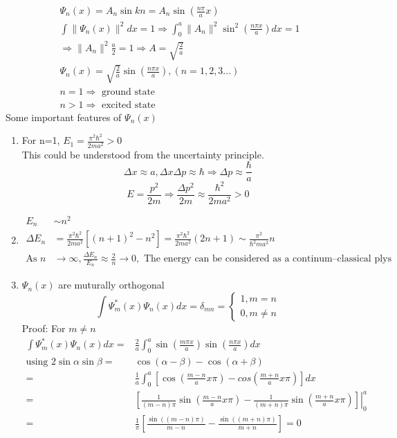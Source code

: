 \documentclass[12pt, a4paper]{article}
\begin{document}
\begin{align*}
\Psi_n(x)=A_n\sin kn=A_n\sin(\frac{n\pi}{a}x)\\
\int\|\Psi_n(x)\|^2dx=1\Rightarrow\int_0^a\|A_n\|^2\sin^2(\frac{n\pi x}{a})dx=1\\
\Rightarrow\|A_n\|^2\frac{a}{2}=1\Rightarrow A=\sqrt{\frac{2}{a}}\\
\Psi_n(x)=\sqrt{\frac{2}{a}}\sin(\frac{n\pi x}{a}), (n=1,2,3...)\\
n=1 \Rightarrow \text{ ground state}\\
n>1 \Rightarrow \text{ excited state}
\end{align*}
Some important features of $\Psi_n(x)$
\begin{enumerate}
\item For n=1, $E_1=\frac{\pi^2\hbar^2}{2ma^2}>0$\\
This could be understood from the uncertainty principle.
$$\Delta x \approx a, \Delta x \Delta p \approx\hbar\Rightarrow \Delta p \approx\frac{\hbar}{a}$$
$$E=\frac{p^2}{2m}\Rightarrow \frac{\Delta p^2}{2m}\approx \frac{\hbar^2}{2ma^2}>0$$
\item
\begin{align*}
E_n&\sim n^2\\
\Delta E_n&=\frac{\pi^2\hbar^2}{2ma^2}\left[(n+1)^2 -n^2\right]=\frac{\pi^2\hbar^2}{2ma^2}(2n+1)\sim \frac{\pi^2}{\hbar^2	ma^2}n\\
\text{As } n&\rightarrow \infty, \frac{\Delta E_n}{E_n}\approx \frac{2}{n}\rightarrow 0, \text{ The energy can be considered as a continum--classical plys}
\end{align*}
\item
$\Psi_n(x)$ are muturally orthogonal
$$\int\Psi_m^*(x)\Psi_n(x)dx=\delta_{mn}=\begin{cases}1,m=n\\0,m\not =n\end{cases}$$
Proof: For $m \not = n$
\begin{align*}
\int\Psi_m^*(x)\Psi_n(x)dx=&\frac{2}{a}\int_0^a\sin(\frac{m\pi x}{a})\sin(\frac{n\pi x}{a}) dx\\
\text{using } 2\sin\alpha\sin\beta=&\cos(\alpha - \beta)-\cos(\alpha+\beta)\\
=&\frac{1}{a}\int_0^a\left[\cos(\frac{m-n}{a}x\pi)-cos(\frac{m+n}{a}x\pi) \right]dx\\
=&\left.\left[ \frac{1}{(m-n)\pi}\sin(\frac{m-n}{a}x\pi)-\frac{1}{(m+n)\pi}\sin(\frac{m+n}{a}x\pi)\right]\right\vert_0^a\\
=&\frac{1}{\pi}\left[ \frac{\sin((m-n)\pi)}{m-n}-\frac{\sin((m+n)\pi)}{m+n}\right] = 0

\end{align*}
\end{enumerate}
\end{document}
